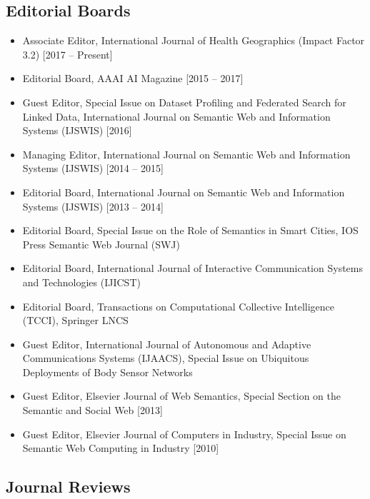\documentclass[10pt,a4paper]{res} %
\begin{document}
\begin{resume}
\subsection*{Editorial Boards}
\begin{itemize} \itemsep -2pt
\item Associate Editor, International Journal of Health Geographics (Impact Factor 3.2) [2017 -- Present]
\item Editorial Board, AAAI AI Magazine [2015 -- 2017]
\item Guest Editor, Special Issue on Dataset Profiling and Federated Search for Linked Data, International Journal on Semantic Web and Information Systems (IJSWIS) [2016]
\item Managing Editor, International Journal on Semantic Web and Information Systems (IJSWIS) [2014 -- 2015]
\item Editorial Board, International Journal on Semantic Web and Information Systems (IJSWIS) [2013 -- 2014]
\item Editorial Board, Special Issue on the Role of Semantics in Smart Cities, IOS Press Semantic Web Journal (SWJ) %
\item Editorial Board, International Journal of Interactive Communication Systems and Technologies (IJICST) %
\item Editorial Board, Transactions on Computational Collective Intelligence (TCCI), Springer LNCS %
\item Guest Editor, International Journal of Autonomous and Adaptive Communications Systems (IJAACS), Special Issue on Ubiquitous Deployments of Body Sensor Networks %
\item Guest Editor, Elsevier Journal of Web Semantics, Special Section on the Semantic and Social Web [2013]
\item Guest Editor, Elsevier Journal of Computers in Industry, Special Issue on Semantic Web Computing in Industry [2010]
\end{itemize}

\subsection*{Journal Reviews}


\end{resume}
\end{document}
